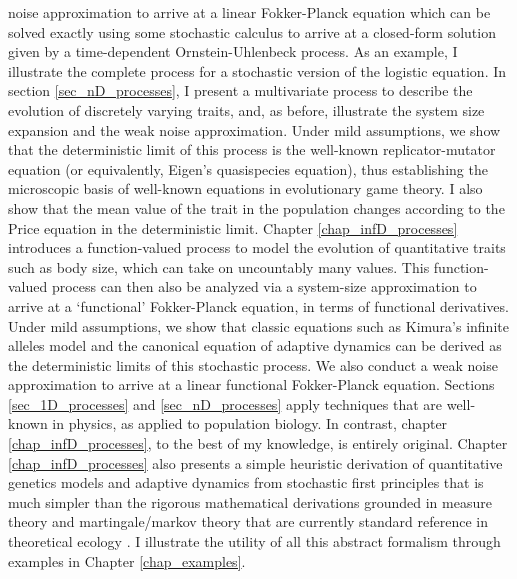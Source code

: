 noise approximation to arrive at a linear Fokker-Planck equation which can be solved exactly using some stochastic calculus to arrive at a closed-form solution given by a time-dependent Ornstein-Uhlenbeck process. As an example, I illustrate the complete process for a stochastic version of the logistic equation. In section \ref{sec_nD_processes}, I present a multivariate process to describe the evolution of discretely varying traits, and, as before, illustrate the system size expansion and the weak noise approximation. Under mild assumptions, we show that the deterministic limit of this process is the well-known replicator-mutator equation (or equivalently, Eigen's quasispecies equation), thus establishing the microscopic basis of well-known equations in evolutionary game theory. I also show that the mean value of the trait in the population changes according to the Price equation in the deterministic limit. Chapter \ref{chap_infD_processes} introduces a function-valued process to model the evolution of quantitative traits such as body size, which can take on uncountably many values. This function-valued process can then also be analyzed via a system-size approximation to arrive at a `functional' Fokker-Planck equation, in terms of functional derivatives. Under mild assumptions, we show that classic equations such as Kimura's infinite alleles model and the canonical equation of adaptive dynamics can be derived as the deterministic limits of this stochastic process. We also conduct a weak noise approximation to arrive at a linear functional Fokker-Planck equation.  Sections \ref{sec_1D_processes} and \ref{sec_nD_processes} apply techniques that are well-known in physics, as applied to population biology. In contrast, chapter \ref{chap_infD_processes}, to the best of my knowledge, is entirely original. Chapter \ref{chap_infD_processes} also presents a simple heuristic derivation of quantitative genetics models and adaptive dynamics from stochastic first principles that is much simpler than the rigorous mathematical derivations grounded in measure theory and martingale/markov theory that are currently standard reference in theoretical ecology \citep{champagnat_individual_2008}. I illustrate the utility of all this abstract formalism through examples in Chapter \ref{chap_examples}.


